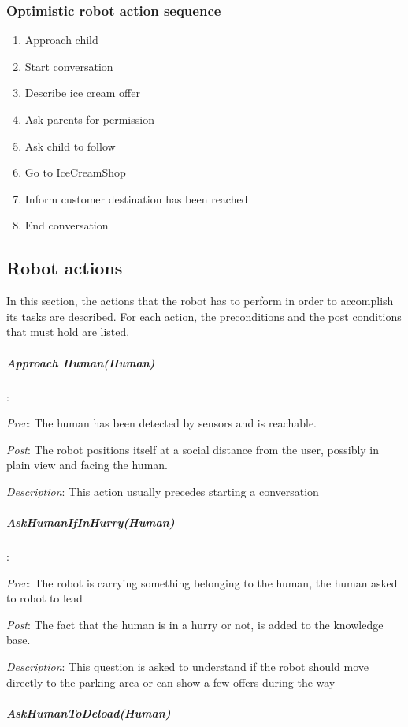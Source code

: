 \subsubsection{Optimistic robot action sequence}
\begin{enumerate}
\item Approach child
\item Start conversation
\item Describe ice cream offer
\item Ask parents for permission
\item Ask child to follow
\item Go to IceCreamShop
\item Inform customer destination has been reached
\item End conversation
\end{enumerate}




\subsection{Robot actions}
\label{sec:robot_actions}

In this section, the actions that the robot has to perform in order to
accomplish its tasks are described.
For each action, the preconditions and the post conditions that must hold are
listed. 


\subparagraph{Approach Human(Human)}

:

\textit{Prec}: The human has been detected by sensors and is reachable.

\textit{Post}: The robot positions itself at a social distance from
the user, possibly in plain view and facing the human.

\textit{Description}: This action usually precedes starting a conversation


\subparagraph{AskHumanIfInHurry(Human)}

:

\textit{Prec}: The robot is carrying something belonging to the human,
the human asked to robot to lead

\textit{Post}: The fact that the human is in a hurry or not, is added
to the knowledge base.

\textit{Description}: This question is asked to understand if the
robot should move directly to the parking area or can show a few offers
during the way


\subparagraph{AskHumanToDeload(Human)}

